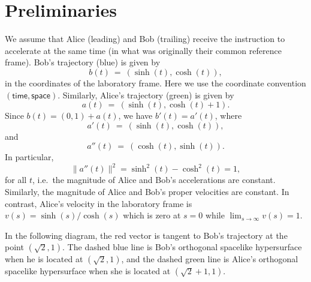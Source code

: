 \documentclass[tikz,border=10pt,fleqn]{article}
\theoremstyle{definition}
\begin{document}
\section{Preliminaries}

We assume that Alice (leading) and Bob (trailing) receive the
instruction to accelerate at the same time (in what was originally
their common reference frame). Bob's trajectory (blue) is given by
\[ b(t) \: = \: (\sinh(t),\cosh(t) ) , \]
in the coordinates of the laboratory frame. Here we use the coordinate
convention $(\mathsf{time},\mathsf{space})$. Similarly, Alice's trajectory
(green) is given by
\[ a(t) \: = \: (\sinh (t),\cosh (t)+1) .\] Since $b(t)=(0,1)+a(t)$,
we have $b'(t)=a'(t)$, where \[ a'(t) \: = \: (\sinh (t),\cosh(t)) ,\]
and
\[ a''(t) \: = \: (\cosh (t),\sinh (t)) .\] In particular,
\[ \| a''(t) \|^2 = \sinh ^2 (t)-\cosh ^2(t) = 1 ,\] for all $t$,
i.e.\ the magnitude of Alice and Bob's accelerations are
constant. Similarly, the magnitude of Alice and Bob's proper
velocities are constant. In contrast, Alice's velocity in the
laboratory frame is $v(s)=\sinh (s)/\cosh (s)$ which is zero at $s=0$
while $\lim _{s\to\infty }v(s)=1$.

In the following diagram, the red vector is tangent to Bob's
trajectory at the point $(\sqrt{2},1)$. The dashed blue line is Bob's
orthogonal spacelike hypersurface when he is located at
$(\sqrt{2},1)$, and the dashed green line is Alice's orthogonal
spacelike hypersurface when she is located at $(\sqrt{2}+1,1)$.
\end{document}
